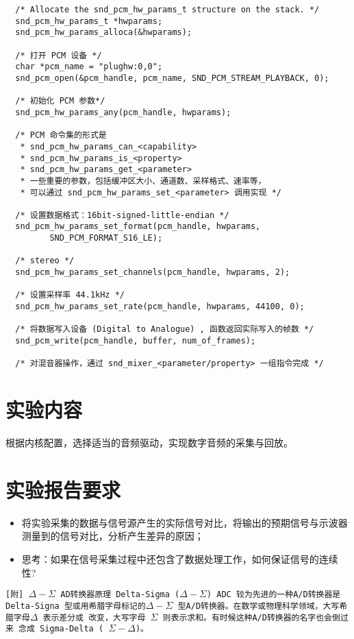 \begin{lstlisting}
  /* Allocate the snd_pcm_hw_params_t structure on the stack. */
  snd_pcm_hw_params_t *hwparams;
  snd_pcm_hw_params_alloca(&hwparams);
  
  /* 打开 PCM 设备 */
  char *pcm_name = "plughw:0,0";
  snd_pcm_open(&pcm_handle, pcm_name, SND_PCM_STREAM_PLAYBACK, 0);
  
  /* 初始化 PCM 参数*/
  snd_pcm_hw_params_any(pcm_handle, hwparams);
  
  /* PCM 命令集的形式是
   * snd_pcm_hw_params_can_<capability>
   * snd_pcm_hw_params_is_<property>
   * snd_pcm_hw_params_get_<parameter>
   * 一些重要的参数，包括缓冲区大小、通道数、采样格式、速率等，
   * 可以通过 snd_pcm_hw_params_set_<parameter> 调用实现 */
  
  /* 设置数据格式：16bit-signed-little-endian */
  snd_pcm_hw_params_set_format(pcm_handle, hwparams,
         SND_PCM_FORMAT_S16_LE);
  
  /* stereo */ 
  snd_pcm_hw_params_set_channels(pcm_handle, hwparams, 2);
  
  /* 设置采样率 44.1kHz */
  snd_pcm_hw_params_set_rate(pcm_handle, hwparams, 44100, 0);
  
  /* 将数据写入设备 (Digital to Analogue) , 函数返回实际写入的帧数 */
  snd_pcm_write(pcm_handle, buffer, num_of_frames);
  
  /* 对混音器操作，通过 snd_mixer_<parameter/property> 一组指令完成 */
\end{lstlisting}


\section{实验内容}

根据内核配置，选择适当的音频驱动，实现数字音频的采集与回放。

\section{实验报告要求}
\begin{itemize}
  \item 将实验采集的数据与信号源产生的实际信号对比，将输出的预期信号与示波器
      测量到的信号对比，分析产生差异的原因；
  \item 思考：如果在信号采集过程中还包含了数据处理工作，如何保证信号的连续性?
\end{itemize}

\newpage
\tt [附] $\Delta-\Sigma$ AD转换器原理
\iffalse
Delta-Sigma ($\Delta-\Sigma$) ADC
较为先进的一种A/D转换器是 Delta-Signa 型或用希腊字母标记的$\Delta-\Sigma$
型A/D转换器。在数学或物理科学领域，大写希腊字母$\Delta$ 表示差分或
改变，大写字母 $\Sigma$ 则表示求和。有时候这种A/D转换器的名字也会倒过来
念成 Sigma-Delta ( $\Sigma-\Delta$)。

